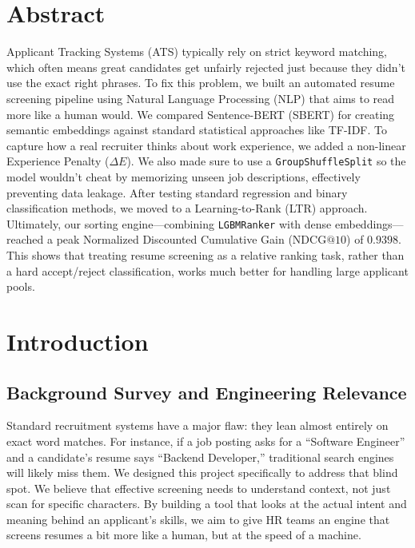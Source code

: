 \documentclass[12pt,a4paper,oneside]{report}
\begin{document}
\newpage
{}
\setcounter{page}{1}

\chapter*{Abstract}

Applicant Tracking Systems (ATS) typically rely on strict keyword matching, which often means great candidates get unfairly rejected just because they didn't use the exact right phrases. To fix this problem, we built an automated resume screening pipeline using Natural Language Processing (NLP) that aims to read more like a human would. We compared Sentence-BERT (SBERT) for creating semantic embeddings against standard statistical approaches like TF-IDF. To capture how a real recruiter thinks about work experience, we added a non-linear Experience Penalty ($\Delta E$). We also made sure to use a \texttt{GroupShuffleSplit} so the model wouldn't cheat by memorizing unseen job descriptions, effectively preventing data leakage. After testing standard regression and binary classification methods, we moved to a Learning-to-Rank (LTR) approach. Ultimately, our sorting engine—combining \texttt{LGBMRanker} with dense embeddings—reached a peak Normalized Discounted Cumulative Gain ($\text{NDCG}@10$) of $0.9398$. This shows that treating resume screening as a relative ranking task, rather than a hard accept/reject classification, works much better for handling large applicant pools.

\tableofcontents
\cleardoublepage

\newpage
{}
\setcounter{page}{1}

\chapter{Introduction}

\section{Background Survey and Engineering Relevance}
Standard recruitment systems have a major flaw: they lean almost entirely on exact word matches. For instance, if a job posting asks for a ``Software Engineer'' and a candidate's resume says ``Backend Developer,'' traditional search engines will likely miss them. We designed this project specifically to address that blind spot. We believe that effective screening needs to understand context, not just scan for specific characters. By building a tool that looks at the actual intent and meaning behind an applicant's skills, we aim to give HR teams an engine that screens resumes a bit more like a human, but at the speed of a machine.
\end{document}
